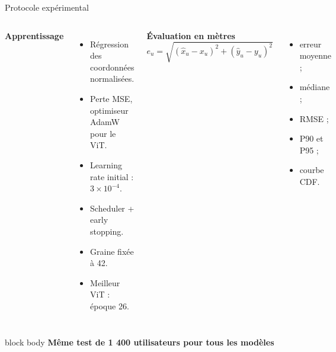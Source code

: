 \documentclass[aspectratio=169,10pt]{beamer}
\newcommand{\keybox}[1]{%
  \begin{beamercolorbox}[rounded=true,sep=0.7em,center]{block body}
    \textbf{\color{insatblue}#1}
  \end{beamercolorbox}%
}
\begin{document}
\begin{frame}{Protocole expérimental}
  \begin{columns}[T,onlytextwidth]
      \textbf{Apprentissage}
      \begin{itemize}
        \item Régression des coordonnées normalisées.
        \item Perte MSE, optimiseur AdamW pour le ViT.
        \item Learning rate initial : $3\times10^{-4}$.
        \item Scheduler + early stopping.
        \item Graine fixée à 42.
        \item Meilleur ViT : époque 26.
      \end{itemize}

      \textbf{Évaluation en mètres}
      \[
        e_u=\sqrt{(\widehat{x}_u-x_u)^2+(\widehat{y}_u-y_u)^2}
      \]
      \begin{itemize}
        \item erreur moyenne ;
        \item médiane ;
        \item RMSE ;
        \item P90 et P95 ;
        \item courbe CDF.
      \end{itemize}
  \end{columns}
  \vspace{0.2cm}
  \keybox{Même test de 1 400 utilisateurs pour tous les modèles}
\end{frame}
\end{document}
